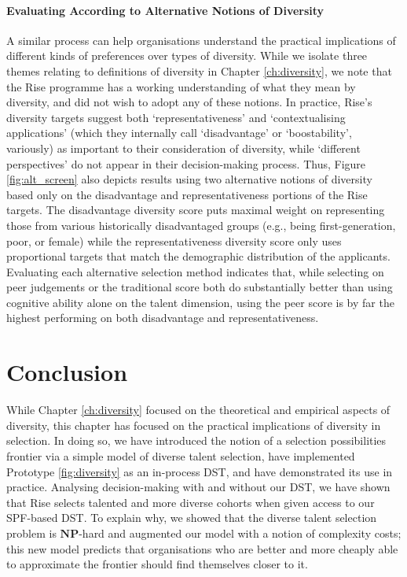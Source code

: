 \paragraph{Evaluating According to Alternative Notions of Diversity} A similar process can help organisations understand the practical implications of different kinds of preferences over types of diversity. While we isolate three themes relating to definitions of diversity in Chapter \ref{ch:diversity}, we note that the Rise programme has a working understanding of what they mean by diversity, and did not wish to adopt any of these notions. In practice, Rise's diversity targets suggest both `representativeness' and `contextualising applications' (which they internally call `disadvantage' or `boostability', variously) as important to their consideration of diversity, while `different perspectives' do not appear in their decision-making process. Thus, Figure \ref{fig:alt_screen} also depicts results using two alternative notions of diversity based only on the disadvantage and representativeness portions of the Rise targets. The disadvantage diversity score puts maximal weight on representing those from various historically disadvantaged groups (e.g., being first-generation, poor, or female) while the representativeness diversity score only uses proportional targets that match the demographic distribution of the applicants. Evaluating each alternative selection method indicates that, while selecting on peer judgements or the traditional score both do substantially better than using cognitive ability alone on the talent dimension, using the peer score is by far the highest performing on both disadvantage and representativeness.

\section{Conclusion} \label{sec:conclusion}
While Chapter \ref{ch:diversity} focused on the theoretical and empirical aspects of diversity, this chapter has focused on the practical implications of diversity in selection. In doing so, we have introduced the notion of a selection possibilities frontier via a simple model of diverse talent selection, have implemented Prototype \ref{fig:diversity} as an in-process DST, and have demonstrated its use in practice. Analysing decision-making with and without our DST, we have shown that Rise selects talented and more diverse cohorts when given access to our SPF-based DST. To explain why, we showed that the diverse talent selection problem is $\mathbf{NP}$-hard and augmented our model with a notion of complexity costs; this new model predicts that organisations who are better and more cheaply able to approximate the frontier should find themselves closer to it. 


